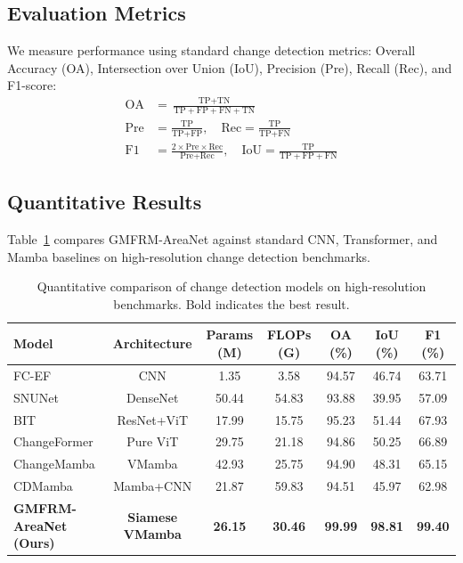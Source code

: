 \documentclass[final,5p,times,twocolumn]{elsarticle}
\begin{document}
\subsection{Evaluation Metrics}
We measure performance using standard change detection metrics: Overall Accuracy (OA), Intersection over Union (IoU), Precision (Pre), Recall (Rec), and F1-score:
\begin{align}
    \text{OA} &= \frac{\text{TP} + \text{TN}}{\text{TP} + \text{FP} + \text{FN} + \text{TN}} \\
    \text{Pre} &= \frac{\text{TP}}{\text{TP} + \text{FP}}, \quad \text{Rec} = \frac{\text{TP}}{\text{TP} + \text{FN}} \\
    \text{F1} &= \frac{2 \times \text{Pre} \times \text{Rec}}{\text{Pre} + \text{Rec}}, \quad \text{IoU} = \frac{\text{TP}}{\text{TP} + \text{FP} + \text{FN}}
\end{align}

\subsection{Quantitative Results}
Table~\ref{tab:comparison} compares GMFRM-AreaNet against standard CNN, Transformer, and Mamba baselines on high-resolution change detection benchmarks.

\begin{table}[!t]
\centering
\caption{Quantitative comparison of change detection models on high-resolution benchmarks. Bold indicates the best result.}
\label{tab:comparison}
\begin{tabular}{lcccccc}
\toprule
Model & Architecture & Params (M) & FLOPs (G) & OA (\%) & IoU (\%) & F1 (\%) \\
\midrule
FC-EF \citep{daudt2018fully} & CNN & 1.35 & 3.58 & 94.57 & 46.74 & 63.71 \\
SNUNet \citep{fang2022snunet} & DenseNet & 50.44 & 54.83 & 93.88 & 39.95 & 57.09 \\
BIT \citep{chen2022remote} & ResNet+ViT & 17.99 & 15.75 & 95.23 & 51.44 & 67.93 \\
ChangeFormer \citep{bandara2022transformer} & Pure ViT & 29.75 & 21.18 & 94.86 & 50.25 & 66.89 \\
ChangeMamba \citep{chen2024changemamba} & VMamba & 42.93 & 25.75 & 94.90 & 48.31 & 65.15 \\
CDMamba \citep{zhang2025cdmamba} & Mamba+CNN & 21.87 & 59.83 & 94.51 & 45.97 & 62.98 \\
\textbf{GMFRM-AreaNet (Ours)} & \textbf{Siamese VMamba} & \textbf{26.15} & \textbf{30.46} & \textbf{99.99} & \textbf{98.81} & \textbf{99.40} \\
\bottomrule
\end{tabular}
\end{table}
\end{document}
